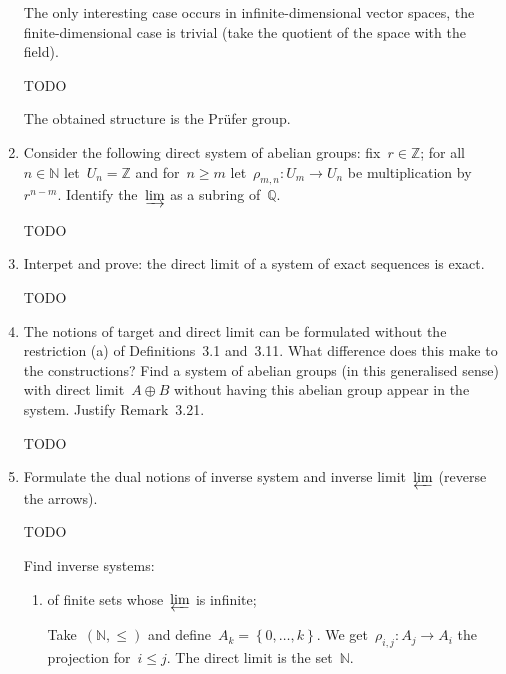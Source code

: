 \documentclass[a4paper,11pt]{article}
\begin{document}
\begin{enumerate}
\begin{solution}
      The only interesting case occurs in infinite-dimensional vector spaces, the finite-dimensional case is trivial (take the quotient of the space with the field).

      TODO

      The obtained structure is the Pr\"ufer group.
    \end{solution}

  \item Consider the following direct system of abelian groups: fix~$r\in\mathbb{Z}$; for all~$n\in\mathbb{N}$ let~$U_n=\mathbb{Z}$ and for~$n\geq m$ let~$\rho_{m,n}\colon U_m\to U_n$ be multiplication by~$r^{n-m}$. Identify the~$\varinjlim$ as a subring of~$\mathbb{Q}$.

    \begin{solution}
      TODO
    \end{solution}

  \item Interpet and prove: the direct limit of a system of exact sequences is exact.

    \begin{solution}
      TODO
    \end{solution}

  \item The notions of target and direct limit can be formulated without the restriction (a) of Definitions~3.1 and~3.11. What difference does this make to the constructions? Find a system of abelian groups (in this generalised sense) with direct limit~$A\oplus B$ without having this abelian group appear in the system. Justify Remark~3.21.

    \begin{solution}
      TODO
    \end{solution}

  \item Formulate the dual notions of inverse system and inverse limit~$\varprojlim$ (reverse the arrows).

    \begin{solution}
      TODO
    \end{solution}
    
    Find inverse systems:
    \begin{enumerate}
      \item of finite sets whose~$\varprojlim$ is infinite;

        \begin{solution}
          Take~$(\mathbb{N},\leq)$ and define~$A_k=\left\{ 0,\ldots,k \right\}$. We get~$\rho_{i,j}\colon A_j\to A_i$ the projection for~$i\leq j$. The direct limit is the set~$\mathbb{N}$.
        \end{solution}


\end{enumerate}
\end{enumerate}
\end{document}
